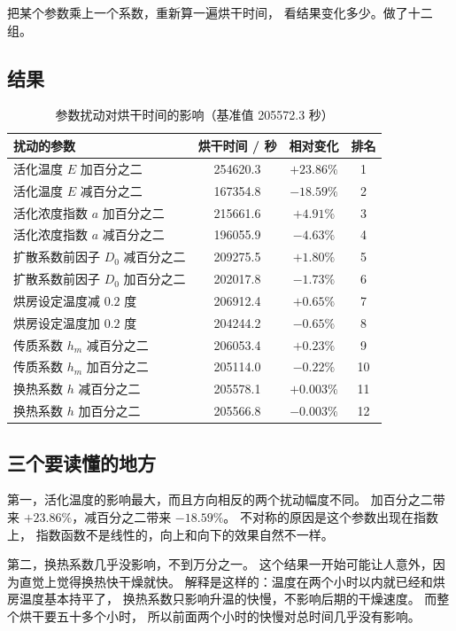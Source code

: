 把某个参数乘上一个系数，重新算一遍烘干时间，
看结果变化多少。做了十二组。

\subsection{结果}

\begin{table}[H]
\centering
\small
\caption{参数扰动对烘干时间的影响（基准值 205572.3 秒）}
\begin{tabular}{@{}lccc@{}}
\toprule
扰动的参数 & 烘干时间 / 秒 & 相对变化 & 排名 \\
\midrule
活化温度 $E$ 加百分之二 & 254620.3 & $+23.86\%$ & 1 \\
活化温度 $E$ 减百分之二 & 167354.8 & $-18.59\%$ & 2 \\
活化浓度指数 $a$ 加百分之二 & 215661.6 & $+4.91\%$ & 3 \\
活化浓度指数 $a$ 减百分之二 & 196055.9 & $-4.63\%$ & 4 \\
扩散系数前因子 $D_0$ 减百分之二 & 209275.5 & $+1.80\%$ & 5 \\
扩散系数前因子 $D_0$ 加百分之二 & 202017.8 & $-1.73\%$ & 6 \\
烘房设定温度减 $0.2$ 度 & 206912.4 & $+0.65\%$ & 7 \\
烘房设定温度加 $0.2$ 度 & 204244.2 & $-0.65\%$ & 8 \\
传质系数 $h_m$ 减百分之二 & 206053.4 & $+0.23\%$ & 9 \\
传质系数 $h_m$ 加百分之二 & 205114.0 & $-0.22\%$ & 10 \\
换热系数 $h$ 减百分之二 & 205578.1 & $+0.003\%$ & 11 \\
换热系数 $h$ 加百分之二 & 205566.8 & $-0.003\%$ & 12 \\
\bottomrule
\end{tabular}
\end{table}

\subsection{三个要读懂的地方}

第一，活化温度的影响最大，而且方向相反的两个扰动幅度不同。
加百分之二带来 $+23.86\%$，减百分之二带来 $-18.59\%$。
不对称的原因是这个参数出现在指数上，
指数函数不是线性的，向上和向下的效果自然不一样。

第二，换热系数几乎没影响，不到万分之一。
这个结果一开始可能让人意外，因为直觉上觉得换热快干燥就快。
解释是这样的：温度在两个小时以内就已经和烘房温度基本持平了，
换热系数只影响升温的快慢，不影响后期的干燥速度。
而整个烘干要五十多个小时，
所以前面两个小时的快慢对总时间几乎没有影响。

